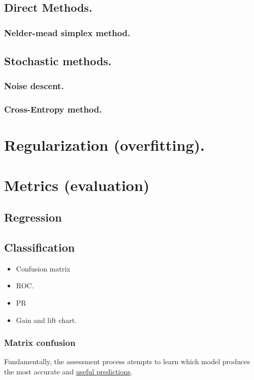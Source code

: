 \documentclass[12pt, a4paper]{book}
\begin{document}
\chapter{Direct Methods.}
\section{Nelder-mead simplex method.}

\chapter{Stochastic methods.}
\section{Noise descent.}
\section{Cross-Entropy  method.}



\part{Regularization (overfitting).}

\part{Metrics (evaluation)}
\chapter{Regression}

\chapter{Classification}
\begin{itemize}
	\item Confusion matrix
	\item ROC.
	\item PR
	\item Gain and lift chart.
\end{itemize}
\section{Matrix confusion}
Fundamentally, the assessment  process atempts to learn which model produces the most accurate and \underline{useful predictions}.
\end{document}

